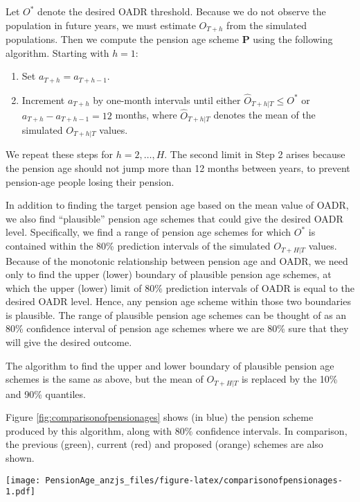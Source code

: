 \documentclass[
  doublespace]{anzsauth}
\providecommand{\tightlist}{%
  \setlength{\itemsep}{0pt}\setlength{\parskip}{0pt}}
\let\origfigure\figure
\let\endorigfigure\endfigure
\renewenvironment{figure}[1][2] {
    \expandafter\origfigure\expandafter[tbp]
} {
    \endorigfigure
}
\begin{document}
Let \(O^*\) denote the desired OADR threshold. Because we do not observe the population in future years, we must estimate \(O_{T+h}\) from the simulated populations. Then we compute the pension age scheme \(\bm{P}\) using the following algorithm. Starting with \(h=1\):

\begin{enumerate}
\def\labelenumi{\arabic{enumi}.}
\tightlist
\item
  Set \(a_{T+h}=a_{T+h-1}\).
\item
  Increment \(a_{T+h}\) by one-month intervals until either \(\widehat{O}_{T+h|T} \le O^*\) or \(a_{T+h} - a_{T+h-1}=12\) months, where \(\widehat{O}_{T+h|T}\) denotes the mean of the simulated \(O_{T+h|T}\) values.
\end{enumerate}

We repeat these steps for \(h=2,\dots,H\). The second limit in Step 2 arises because the pension age should not jump more than 12 months between years, to prevent pension-age people losing their pension.

In addition to finding the target pension age based on the mean value of OADR, we also find ``plausible'' pension age schemes that could give the desired OADR level. Specifically, we find a range of pension age schemes for which \(O^*\) is contained within the 80\% prediction intervals of the simulated \(O_{T+H|T}\) values. Because of the monotonic relationship between pension age and OADR, we need only to find the upper (lower) boundary of plausible pension age schemes, at which the upper (lower) limit of 80\% prediction intervals of OADR is equal to the desired OADR level. Hence, any pension age scheme within those two boundaries is plausible. The range of plausible pension age schemes can be thought of as an 80\% confidence interval of pension age schemes where we are 80\% sure that they will give the desired outcome.

The algorithm to find the upper and lower boundary of plausible pension age schemes is the same as above, but the mean of \(O_{T+H|T}\) is replaced by the 10\% and 90\% quantiles.

Figure \ref{fig:comparisonofpensionages} shows (in blue) the pension scheme produced by this algorithm, along with 80\% confidence intervals. In comparison, the previous (green), current (red) and proposed (orange) schemes are also shown.

\begin{figure}
\centering
\texttt{[image: PensionAge\_anzjs\_files/figure-latex/comparisonofpensionages-1.pdf]}
\caption{\label{fig:comparisonofpensionages}The target pension age scheme (in blue) along with the pension age schemes that have been set and proposed by the government. The blue shaded region shows 80\% confidence intervals for the target pension age.}
\end{figure}
\end{document}
